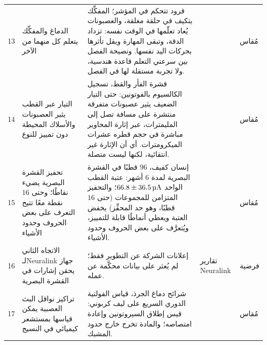 {\begin{longtable}{>{\raggedright}p{0.5cm}>{\raggedright}p{4.0cm}>{\raggedright}p{5.6cm}>{\raggedright}p{2.3cm}>{\raggedright\arraybackslash}p{1.7cm}}
13 & الدماغ والمفكِّك يتعلم كل منهما من الآخر & قرود تتحكم في المؤشر؛ المفكِّك يتكيف في حلقة مغلقة، والعصبونات يُعاد تعلّمها في الوقت نفسه: تزداد الدقة، وتبقى المهارة ويقل تأثرها بحركات اليد نفسها. ونصيحة الفصل بين سرعتي التعلم قاعدة هندسية، ولا تجربة مستقلة لها في الفصل. & \cite{Orsborn2014coad} & مُقاس \\
14 & التيار عبر القطب يثير العصبونات والأسلاك المحيطة دون تمييز للنوع & قشرة الفأر والقط، تسجيل الكالسيوم بالفوتونين: حتى التيار الضعيف يثير عصبونات متفرقة منتشرة على مسافة تصل إلى المليمترات، عبر إثارة المحاوير مباشرة في حجم قطره عشرات الميكرومترات. أي أن الإثارة غير انتقائية، لكنها ليست متصلة. & \cite{Histed2009stim} & مُقاس \\
15 & تحفيز القشرة البصرية يضيء نقاطًا؛ وحتى $16$ نقطة معًا تتيح التعرف على بعض الحروف وحدود الأشياء & إنسان كفيف، $96$ قطبًا في القشرة البصرية لمدة $6$ أشهر: عتبة القطب الواحد $66.8\pm36.5\,\text{\textmu A}$؛ والتحفيز المتزامن للمجموعات (حتى $16$ قطبًا، وهو حد المحفِّز) يخفض العتبة ويعطي أنماطًا قابلة للتمييز، ويُتعرَّف على بعض الحروف وحدود الأشياء. & \cite{Fernandez2021} & مُقاس \\
16 & الاتجاه الثاني لـ\foreignlanguage{english}{Neuralink} جهاز يحقن إشارات في القشرة البصرية & إعلانات الشركة عن التطوير فقط؛ لم يُعثر على بيانات محكَّمة عن عمله. & تقارير \foreignlanguage{english}{Neuralink} & فرضية \\
17 & تراكيز نواقل البث العصبية يمكن قياسها بمستشعر كيميائي في النسيج & شرائح دماغ الجرذ، قياس الفولتية الدوري السريع على ليف كربوني: قيس إطلاق السيروتونين وإعادة امتصاصه؛ والمادة تخرج خارج حدود المشبك. & \cite{Bunin1998} & مُقاس \\
\bottomrule
\end{longtable}}
